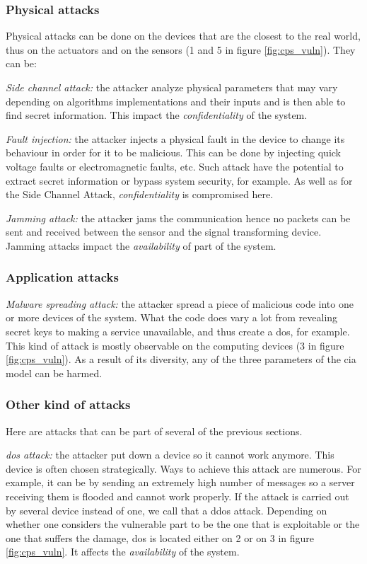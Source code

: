 \documentclass[12pt]{report}
\begin{document}
\subsubsection{Physical attacks}
Physical attacks can be done on the devices that are the closest to the real world, thus on the actuators and on the sensors (1 and 5 in figure \ref{fig:cps_vuln}). 
They can be:

\textit{Side channel attack:} the attacker analyze physical parameters that may vary depending on algorithms implementations and their inputs and is then able to find secret information. This impact the \textit{confidentiality} of the system.

\textit{Fault injection:} the attacker injects a physical fault in the device to change its behaviour in order for it to be malicious. This can be done by injecting quick voltage faults or electromagnetic faults, etc. Such attack have the potential to extract secret information or bypass system security, for example. As well as for the Side Channel Attack, \textit{confidentiality} is compromised here.

\textit{Jamming attack:} the attacker jams the communication hence no packets can be sent and received between the sensor and the signal transforming device. Jamming attacks impact the \textit{availability} of part of the system.

\subsubsection{Application attacks}
\textit{Malware spreading attack:} the attacker spread a piece of malicious code into one or more devices of the system. What the code does vary a lot from revealing secret keys to making a service unavailable, and thus create a \gls{dos}, for example. This kind of attack is mostly observable on the computing devices (3 in figure \ref{fig:cps_vuln}). As a result of its diversity, any of the three parameters of the \gls{cia} model can be harmed.

\subsubsection{Other kind of attacks}
Here are attacks that can be part of several of the previous sections.

\textit{\gls{dos} attack:} the attacker put down a device so it cannot work anymore. This device is often chosen strategically. Ways to achieve this attack are numerous. For example, it can be by sending an extremely high number of messages so a server receiving them is flooded and cannot work properly. If the attack is carried out by several device instead of one, we call that a \gls{ddos} attack. Depending on whether one considers the vulnerable part to be the one that is exploitable or the one that suffers the damage, \gls{dos} is located either on 2 or on 3 in figure \ref{fig:cps_vuln}. It affects the \textit{availability} of the system.
\end{document}
